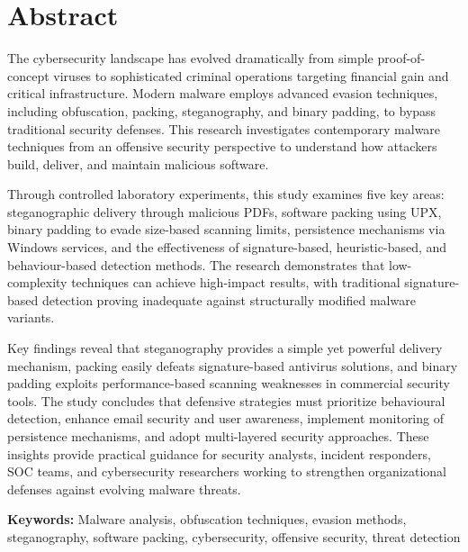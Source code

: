 \chapter*{Abstract}

The cybersecurity landscape has evolved dramatically from simple proof-of-concept viruses to sophisticated criminal operations targeting financial gain and critical infrastructure. Modern malware employs advanced evasion techniques, including obfuscation, packing, steganography, and binary padding, to bypass traditional security defenses. This research investigates contemporary malware techniques from an offensive security perspective to understand how attackers build, deliver, and maintain malicious software.

Through controlled laboratory experiments, this study examines five key areas: steganographic delivery through malicious PDFs, software packing using UPX, binary padding to evade size-based scanning limits, persistence mechanisms via Windows services, and the effectiveness of signature-based, heuristic-based, and behaviour-based detection methods. The research demonstrates that low-complexity techniques can achieve high-impact results, with traditional signature-based detection proving inadequate against structurally modified malware variants.

Key findings reveal that steganography provides a simple yet powerful delivery mechanism, packing easily defeats signature-based antivirus solutions, and binary padding exploits performance-based scanning weaknesses in commercial security tools. The study concludes that defensive strategies must prioritize behavioural detection, enhance email security and user awareness, implement monitoring of persistence mechanisms, and adopt multi-layered security approaches. These insights provide practical guidance for security analysts, incident responders, SOC teams, and cybersecurity researchers working to strengthen organizational defenses against evolving malware threats.

\textbf{Keywords:} Malware analysis, obfuscation techniques, evasion methods, steganography, software packing, cybersecurity, offensive security, threat detection
